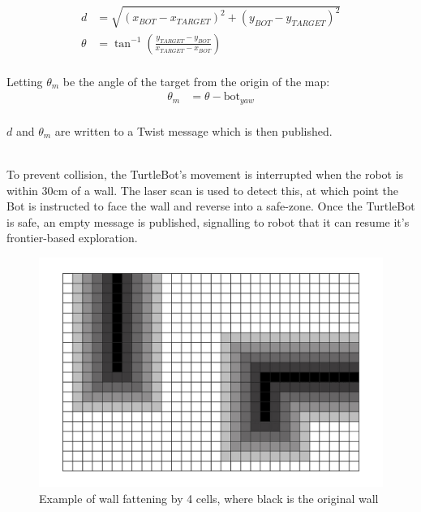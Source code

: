 \documentclass[titlepage,12pt,a4paper]{article}
\begin{document}
\begin{align*}
	d			&=	\sqrt{(x_{BOT} - x_{TARGET})^2 + (y_{BOT} - y_{TARGET})^2} \\
	\theta		&=	\tan^{-1}{(\frac{y_{TARGET} - y_{BOT}}{x_{TARGET} - x_{BOT}})} \\
\end{align*}

Letting $\theta_m$ be the angle of the target from the origin of the map:
\begin{align*}
		\theta_m 	&=	\theta - \text{bot}_{yaw} \\
\end{align*}

\noindent
$d$ and $\theta_m$ are written to a Twist message which is then published.\\
\\


\pagebreak

\noindent
To prevent collision, the TurtleBot's movement is interrupted when the robot is within 30cm of a wall. The laser scan is used to detect this, at which point the Bot is instructed to face the wall and reverse into a safe-zone. Once the TurtleBot is safe, an empty message is published, signalling to robot that it can resume it's frontier-based exploration. \\

\begin{figure}[h]
	\begin{center}
	\includegraphics[scale=0.25]{wallfatten.jpg}
	\caption{Example of wall fattening by 4 cells, where black is the original wall}
	\end{center}
\end{figure}
\end{document}
